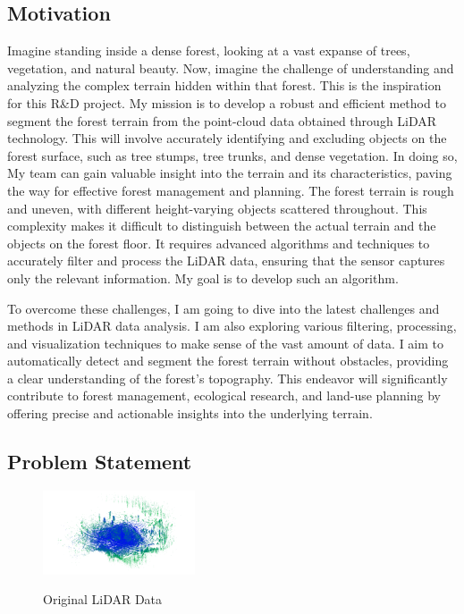 \documentclass[../report.tex]{subfiles}
\begin{document}
    \subsection{Motivation}
    \label{sec:introduction:motivation}
Imagine standing inside a dense forest, looking at a vast expanse of trees, vegetation, and natural beauty. Now, imagine the challenge of understanding and analyzing the complex terrain hidden within that forest. This is the inspiration for this R\&D project. My mission is to develop a robust and efficient method to segment the forest terrain from the point-cloud data obtained through LiDAR technology. This will involve accurately identifying and excluding objects on the forest surface, such as tree stumps, tree trunks, and dense vegetation. In doing so, My team can gain valuable insight into the terrain and its characteristics, paving the way for effective forest management and planning.
{The forest terrain is rough and uneven, with different height-varying objects scattered throughout. This complexity makes it difficult to distinguish between the actual terrain and the objects on the forest floor. It requires advanced algorithms and techniques to accurately filter and process the LiDAR data, ensuring that the sensor captures only the relevant information. My goal is to develop such an algorithm.}

{To overcome these challenges, I am going to dive into the latest challenges and methods in LiDAR data analysis. I am also exploring various filtering, processing, and visualization techniques to make sense of the vast amount of data. I aim to automatically detect and segment the forest terrain without obstacles, providing a clear understanding of the forest's topography. This endeavor will significantly contribute to forest management, ecological research, and land-use planning by offering precise and actionable insights into the underlying terrain.}
    
    \subsection{Problem Statement}
    \label{sec:introduction:problem_statement}
    \begin{figure}[H]
        \centering
        \includegraphics[width=0.4\textwidth]{rnd-project-report-main/figures/Original_data.png}
        \label{raw_data}
        \caption{Original LiDAR Data}
    \end{figure}
    
\end{document}
